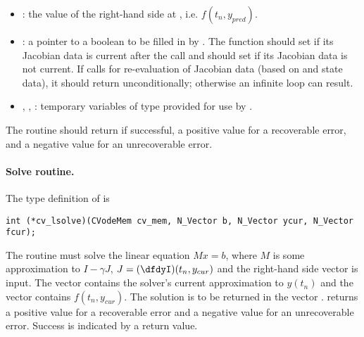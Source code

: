 \begin{itemize}
\item {}: the value of the right-hand side at , 
  i.e. $f(t_n, y_{pred})$.
  
\item {}: a pointer to a boolean to be filled in by .  
  The function should set  if its Jacobian 
  data is current after the call and should set         
   if its Jacobian data is not current.   
  If  calls for re-evaluation of         
  Jacobian data (based on  and {\cvodes} state      
  data), it should return  unconditionally;
  otherwise an infinite loop can result.                
  
\item {}, , : 
  temporary variables of type  provided for use by .      
  
\end{itemize}

The  routine should return  if successful,            
a positive value for a recoverable error, and a negative value  
for an unrecoverable error.  

\paragraph{Solve routine.}
The type definition of  is
\begin{verbatim}
int (*cv_lsolve)(CVodeMem cv_mem, N_Vector b, N_Vector ycur, N_Vector fcur);  
\end{verbatim}
The routine  must solve the linear equation $M x = b$, where         
$M$ is some approximation to $I - \gamma J$, $J = (\dfdyI)(t_n, y_{cur})$  
and the right-hand side vector  is input. The vector 
contains the solver's current approximation to $y(t_n)$ and the vector      
 contains $f(t_n,y_{cur})$. The solution is to be    
returned in the vector .  returns a positive value    
for a recoverable error and a negative value for an             
unrecoverable error. Success is indicated by a  return value.

